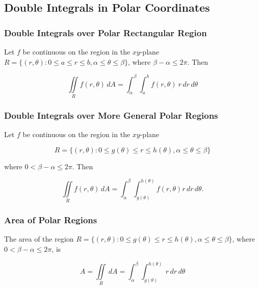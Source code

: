 \subsection{Double Integrals in Polar Coordinates}
\subsubsection{Double Integrals over Polar Rectangular Region}
Let $f$ be continuous on the region in the $xy$-plane $R = \{ (r, \theta): 0 \leq a \leq r \leq b, \alpha \leq \theta \leq \beta \}$, where $\beta - \alpha \leq 2\pi$. Then

\begin{equation}
    \iint \limits _R f(r, \theta) \, dA = \int _\alpha ^\beta \int _a ^b f(r, \theta) \ r \,dr\,d\theta
\end{equation}

\subsubsection{Double Integrals over More General Polar Regions}
Let $f$ be continuous on the region in the $xy$-plane

\begin{equation}
    R = \{ (r, \theta): 0 \leq g(\theta) \leq r \leq h(\theta), \alpha \leq \theta \leq \beta \}
\end{equation}

where $0 < \beta - \alpha \leq 2\pi$. Then

\begin{equation}
    \iint \limits _R f(r, \theta) \,dA = \int _\alpha ^\beta \int _{g(\theta)} ^{h(\theta)} f(r, \theta) r \,dr\,d\theta.
\end{equation}

\subsubsection{Area of Polar Regions}
The area of the region $R = \{ (r, \theta): 0 \leq g(\theta) \leq r \leq h(\theta), \alpha \leq \theta \leq \beta \}$, where $0 < \beta - \alpha \leq 2\pi$, is

\begin{equation}
    A = \iint \limits _R \, dA = \int _\alpha ^\beta \int _{g(\theta)} ^{h(\theta)} \ r \,dr\,d\theta
\end{equation}

